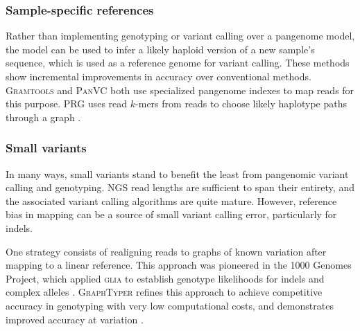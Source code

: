 
\subsubsection{Sample-specific references}

Rather than implementing genotyping or variant calling over a pangenome model, the model can be used to infer a likely haploid version of a new sample's sequence, which is used as a reference genome for variant calling.
These methods show incremental improvements in accuracy over conventional methods.
\textsc{Gramtools} \cite{Maciuca_2016} and \textsc{PanVC} \cite{Valenzuela_2018} both use specialized pangenome indexes to map reads for this purpose.
\textsc{PRG} uses read $k$-mers from reads to choose likely haplotype paths through a graph \cite{dilthey2015improved}.

\subsubsection{Small variants}

In many ways, small variants stand to benefit the least from pangenomic variant calling and genotyping.
NGS read lengths are sufficient to span their entirety, and the associated variant calling algorithms are quite mature.
However, reference bias in mapping can be a source of small variant calling error, particularly for indels. %

One strategy consists of realigning reads to graphs of known variation after mapping to a linear reference.
This approach was pioneered in the 1000 Genomes Project, which applied \textsc{glia} to establish genotype likelihoods for indels and complex alleles \cite{1000_2015}.
\textsc{GraphTyper} refines this approach to achieve competitive accuracy in genotyping with very low computational costs, and demonstrates improved accuracy at variation \cite{eggertsson2017graphtyper}.


